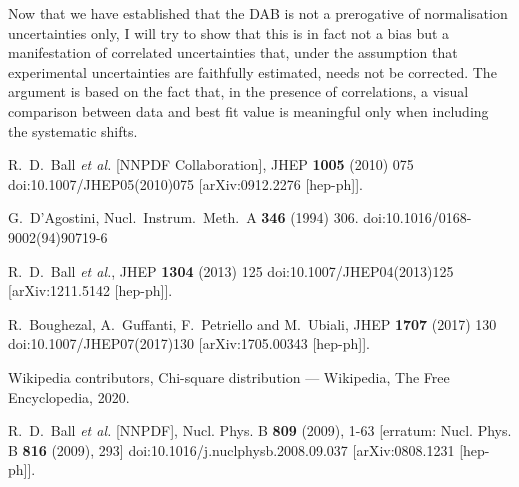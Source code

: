 \documentclass[10pt,a4paper]{article}
\begin{document}
Now that we have established that the DAB is not a prerogative of
normalisation uncertainties only, I will try to show that this is in
fact not a bias but a manifestation of correlated uncertainties that,
under the assumption that experimental uncertainties are faithfully
estimated, needs not be corrected. The argument is based on the fact
that, in the presence of correlations, a visual comparison between
data and best fit value is meaningful only when including the
systematic shifts.




\begin{thebibliography}{alp}

  R.~D.~Ball {\it et al.} [NNPDF Collaboration],
  JHEP {\bf 1005} (2010) 075
  doi:10.1007/JHEP05(2010)075
  [arXiv:0912.2276 [hep-ph]].

  G.~D'Agostini,
  Nucl.\ Instrum.\ Meth.\ A {\bf 346} (1994) 306.
  doi:10.1016/0168-9002(94)90719-6

  R.~D.~Ball {\it et al.},
  JHEP {\bf 1304} (2013) 125
  doi:10.1007/JHEP04(2013)125
  [arXiv:1211.5142 [hep-ph]].

  R.~Boughezal, A.~Guffanti, F.~Petriello and M.~Ubiali,
  JHEP {\bf 1707} (2017) 130
  doi:10.1007/JHEP07(2017)130
  [arXiv:1705.00343 [hep-ph]].

    Wikipedia contributors,
    Chi-square distribution --- {Wikipedia}{,} The Free Encyclopedia,
    2020.

R.~D.~Ball \textit{et al.} [NNPDF],
Nucl. Phys. B \textbf{809} (2009), 1-63
[erratum: Nucl. Phys. B \textbf{816} (2009), 293]
doi:10.1016/j.nuclphysb.2008.09.037
[arXiv:0808.1231 [hep-ph]].


\end{thebibliography}
\end{document}
